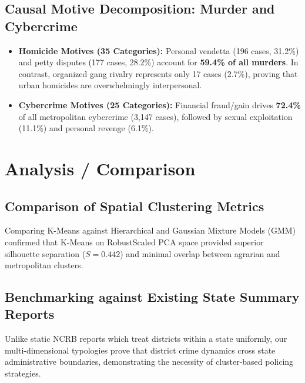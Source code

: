 \documentclass[12pt,a4paper]{report}
\begin{document}
\section{Causal Motive Decomposition: Murder and Cybercrime}
\begin{itemize}[leftmargin=*]
    \item \textbf{Homicide Motives (35 Categories):} Personal vendetta (196 cases, 31.2\%) and petty disputes (177 cases, 28.2\%) account for \textbf{59.4\% of all murders}. In contrast, organized gang rivalry represents only 17 cases (2.7\%), proving that urban homicides are overwhelmingly interpersonal.
    \item \textbf{Cybercrime Motives (25 Categories):} Financial fraud/gain drives \textbf{72.4\%} of all metropolitan cybercrime (3,147 cases), followed by sexual exploitation (11.1\%) and personal revenge (6.1\%).
\end{itemize}

\chapter{Analysis / Comparison}

\section{Comparison of Spatial Clustering Metrics}
Comparing K-Means against Hierarchical and Gaussian Mixture Models (GMM) confirmed that K-Means on RobustScaled PCA space provided superior silhouette separation ($S = 0.442$) and minimal overlap between agrarian and metropolitan clusters.

\section{Benchmarking against Existing State Summary Reports}
Unlike static NCRB reports which treat districts within a state uniformly, our multi-dimensional typologies prove that district crime dynamics cross state administrative boundaries, demonstrating the necessity of cluster-based policing strategies.
\end{document}
